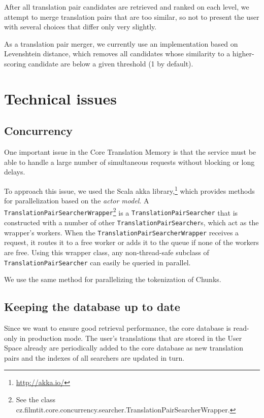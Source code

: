 After all translation pair candidates are retrieved and ranked on each level, we attempt to merge translation pairs that are too similar, so not to present the user with several choices that differ only very slightly.

As a translation pair merger, we currently use an implementation based on Levenshtein distance, which removes all candidates whose similarity to a higher-scoring candidate are below a given threshold (1 by default).




\section{Technical issues}

\subsection{Concurrency}

One important issue in the Core Translation Memory is that the service must be able to handle a large number of simultaneous requests without blocking or long delays. 

To approach this issue, we used the Scala akka library,\footnote{\url{http://akka.io/}} which provides methods for parallelization based on the \emph{actor model}. A {\tt TranslationPairSearcherWrapper}\footnote{See  the class cz.filmtit.core.concurrency.searcher.TranslationPairSearcherWrapper.} is a {\tt TranslationPairSearcher} that is constructed with a number of other {\tt TranslationPairSearcher}s, which act as the wrapper's workers. When the {\tt TranslationPairSearcherWrapper} receives a request, it routes it to a free worker or adds it to the queue if none of the workers are free. Using this wrapper class, any non-thread-safe subclass of {\tt TranslationPairSearcher} can easily be queried in parallel.

We use the same method for parallelizing the tokenization of Chunks.


\subsection{Keeping the database up to date}

Since we want to ensure good retrieval performance, the core database is read-only in production mode. The user's translations that are stored in the User Space already are periodically added to the core database as new translation pairs and the indexes of all searchers are updated in turn.



